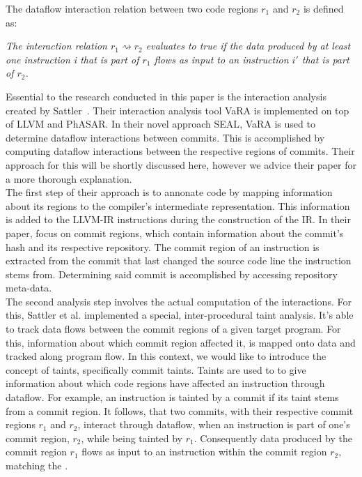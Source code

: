 The dataflow interaction relation between two code regions $r_1$ and $r_2$ is defined as:

\begin{definition}\label{def:dataflow_relation}
	\emph{The interaction relation $r_1 \rightsquigarrow r_2$ evaluates to true if the data produced by at least one instruction i that is part of $r_1$
	flows as input to an instruction $i'$ that is part of $r_2$.}
\end{definition}

Essential to the research conducted in this paper is the interaction analysis created by Sattler~\cite{sattler2023thesis}.
Their interaction analysis tool VaRA is implemented on top of LLVM and PhASAR.
In their novel approach SEAL\cite{sattler2023seal}, VaRA is used to determine dataflow interactions between commits.
This is accomplished by computing dataflow interactions between the respective regions of commits.
Their approach for this will be shortly discussed here, however we advice their paper for a more thorough explanation. \\
The first step of their approach is to annonate code by mapping information about its regions to the compiler's intermediate representation.
This information is added to the LLVM-IR instructions during the construction of the IR.
In their paper, \citet{sattler2023seal} focus on commit regions, which contain information about the commit's hash and its respective repository.
The commit region of an instruction is extracted from the commit that last changed the source code line the instruction stems from.
Determining said commit is accomplished by accessing repository meta-data. \\
The second analysis step involves the actual computation of the interactions.
For this, Sattler et al. implemented a special, inter-procedural taint analysis.
It's able to track data flows between the commit regions of a given target program.
For this, information about which commit region affected it, is mapped onto data and tracked along program flow.
In this context, we would like to introduce the concept of taints, specifically commit taints.
Taints are used to to give information about which code regions have affected an instruction through dataflow.
For example, an instruction is tainted by a commit if its taint stems from a commit region.
It follows, that two commits, with their respective commit regions $r_1$ and $r_2$, interact through dataflow, when an instruction is part of one's commit region, $r_2$, while being tainted by $r_1$.
Consequently data produced by the commit region $r_1$ flows as input to an instruction within the commit region $r_2$, matching the \lowercase{}.

